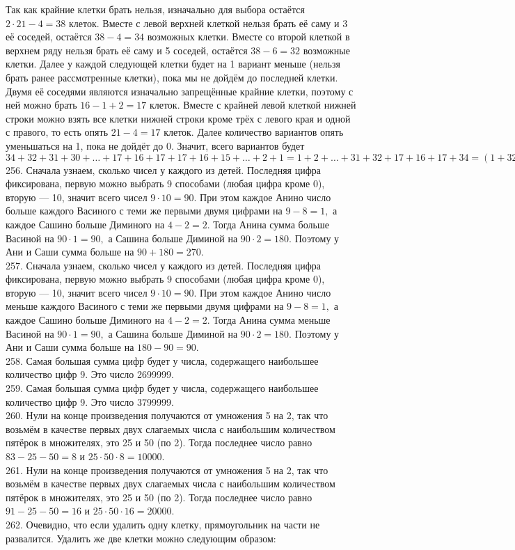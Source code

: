 Так как крайние клетки брать нельзя, изначально для выбора остаётся $2\cdot21-4=38$ клеток. Вместе с левой верхней клеткой нельзя брать её саму и 3 её соседей, остаётся $38-4=34$ возможных клетки. Вместе со второй клеткой в верхнем ряду нельзя брать её саму и 5 соседей, остаётся $38-6=32$ возможные клетки. Далее у каждой следующей клетки будет на 1 вариант меньше (нельзя брать ранее рассмотренные клетки), пока мы не дойдём до последней клетки. Двумя её соседями являются изначально запрещённые крайние клетки, поэтому с ней можно брать $16-1+2=17$ клеток. Вместе с крайней левой клеткой нижней строки можно взять все клетки нижней строки кроме трёх с левого края и одной с правого, то есть опять $21-4=17$ клеток. Далее количество вариантов опять уменьшаться на 1, пока не дойдёт до 0. Значит, всего вариантов будет $34+32+31+30+\ldots+17+16+17+17+16+15+\ldots+2+1=1+2+\ldots+31+32+17+16+17+34=(1+32)+(2+21)+\ldots+(16+17)+84=33\cdot16+84=612.$\\
256. Сначала узнаем, сколько чисел у каждого из детей. Последняя цифра фиксирована, первую можно выбрать 9 способами (любая цифра кроме 0), вторую --- 10, значит всего чисел $9\cdot10=90.$ При этом каждое Анино число больше каждого Васиного с теми же первыми двумя цифрами на $9-8=1,$ а каждое Сашино больше Диминого на $4-2=2.$ Тогда Анина сумма больше Васиной на $90\cdot1=90,$ а Сашина больше Диминой на $90\cdot2=180.$ Поэтому у Ани и Саши сумма больше на $90+180=270.$\\
257. Сначала узнаем, сколько чисел у каждого из детей. Последняя цифра фиксирована, первую можно выбрать 9 способами (любая цифра кроме 0), вторую --- 10, значит всего чисел $9\cdot10=90.$ При этом каждое Анино число меньше каждого Васиного с теми же первыми двумя цифрами на $9-8=1,$ а каждое Сашино больше Диминого на $4-2=2.$ Тогда Анина сумма меньше Васиной на $90\cdot1=90,$ а Сашина больше Диминой на $90\cdot2=180.$ Поэтому у Ани и Саши сумма больше на $180-90=90.$\\
258. Самая большая сумма цифр будет у числа, содержащего наибольшее количество цифр 9. Это число 2699999.\\
259. Самая большая сумма цифр будет у числа, содержащего наибольшее количество цифр 9. Это число 3799999.\\
260. Нули на конце произведения получаются от умножения 5 на 2, так что возьмём в качестве первых двух слагаемых числа с наибольшим количеством пятёрок в множителях, это 25 и 50 (по 2). Тогда последнее число равно $83-25-50=8$ и $25\cdot50\cdot8=10000.$\\
261. Нули на конце произведения получаются от умножения 5 на 2, так что возьмём в качестве первых двух слагаемых числа с наибольшим количеством пятёрок в множителях, это 25 и 50 (по 2). Тогда последнее число равно $91-25-50=16$ и $25\cdot50\cdot16=20000.$\\
262. Очевидно, что если удалить одну клетку, прямоугольник на части не развалится. Удалить же две клетки можно следующим образом:
\begin{center}
\begin{figure}[ht!]
\end{figure}
\end{center}

